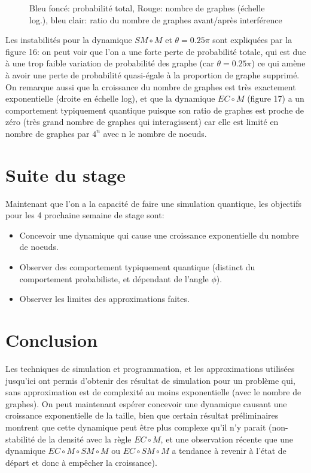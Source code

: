\documentclass[11pts,french]{article}
\begin{document}
\begin{figure}[h!]
\captionsetup{labelformat=empty}
\caption{Bleu foncé: probabilité total, Rouge: nombre de graphes (échelle log.), bleu clair: ratio du nombre de graphes avant/après interférence }

\end{figure}

Les instabilités pour la dynamique $SM \circ M$ et $\theta=0.25\pi$ sont expliquées par la figure 16: on peut voir que l'on a une forte perte de probabilité totale, qui est due à une trop faible variation de probabilité des graphe (car $\theta=0.25\pi$) ce qui amène à avoir une perte de probabilité quasi-égale à la proportion de graphe supprimé. \\

On remarque aussi que la croissance du nombre de graphes est très exactement exponentielle (droite en échelle log), et que la dynamique $EC \circ M$ (figure 17) a un comportement typiquement quantique puisque son ratio de graphes est proche de zéro (très grand nombre de graphes qui interagissent) car elle est limité en nombre de graphes par $4^n$ avec n le nombre de noeuds.

\section{ Suite du stage }

Maintenant que l'on a la capacité de faire une simulation quantique, les objectifs pour les 4 prochaine semaine de stage sont:

\begin{itemize}
\itemsep0em
    \item Concevoir une dynamique qui cause une croissance exponentielle du nombre de noeuds.
    \item Observer des comportement typiquement quantique (distinct du comportement probabiliste, et dépendant de l'angle $\phi$).
    \item Observer les limites des approximations faites.
\end{itemize}

\pagebreak{}

\section{ Conclusion }

Les techniques de simulation et programmation, et les approximations utilisées jusqu'ici ont permis d'obtenir des résultat de simulation pour un problème qui, sans approximation est de complexité au moins exponentielle (avec le nombre de graphes). On peut maintenant espérer concevoir une dynamique causant une croissance exponentielle de la taille, bien que certain résultat préliminaires montrent que cette dynamique peut être plus complexe qu'il n'y parait (non-stabilité de la densité avec la règle $EC \circ M$, et une observation récente que une dynamique $EC \circ M \circ SM \circ M$ ou $EC \circ SM \circ M$ a tendance à revenir à l'état de départ et donc à empêcher la croissance). \\
\end{document}
